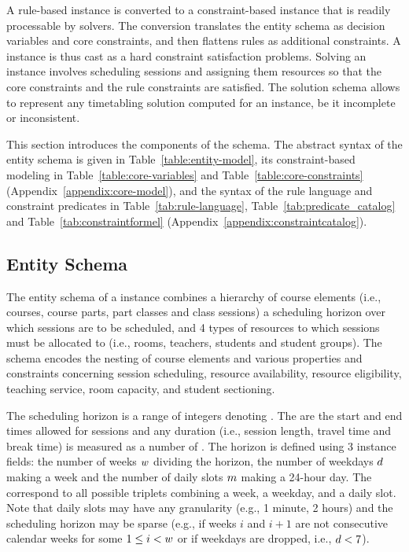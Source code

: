 \documentclass[runningheads]{llncs}
\begin{document}
A rule-based \UTP{} instance is 
converted
to a constraint-based instance
that is readily processable by solvers.
The conversion 
translates the entity schema as decision variables and core constraints, and then flattens rules as additional constraints.
A \UTP{} instance is thus cast as a hard constraint satisfaction problems.
Solving an instance involves scheduling sessions
and assigning them resources 
so that the core constraints and the rule constraints are satisfied.
The solution schema allows to represent
any timetabling solution computed for an instance,
be it incomplete or inconsistent.

This section introduces
the components of the schema.
The abstract syntax of the entity schema
is given in Table~\ref{table:entity-model},
its constraint-based modeling in
Table~\ref{table:core-variables} and
Table~\ref{table:core-constraints}
(Appendix~\ref{appendix:core-model}),
and the syntax of the rule language
and constraint predicates in
Table~\ref{tab:rule-language},
Table~\ref{tab:predicate_catalog} and
Table~\ref{tab:constraintformel}
(Appendix~\ref{appendix:constraintcatalog}).


\subsection{Entity Schema}
\label{sec:entity-schema}



The entity schema 
of a \UTP{} instance
combines
a hierarchy of course elements (i.e., courses, course parts, part classes and class sessions)
a scheduling horizon over which sessions are to be scheduled,
and 4 types of resources to which sessions must be allocated to
(i.e., rooms, teachers, students and student groups).
The schema encodes the nesting of course elements
and various properties and constraints 
concerning 
session scheduling,
resource availability, 
resource eligibility,
teaching service,
room capacity,
and student sectioning. 

The scheduling horizon is a range
of integers denoting \timepoints{}.
The \timepoints{} are the start and end times allowed for sessions
and any duration (i.e., session length, travel time and break time)
is measured as a number of \timepoints{}. 
The horizon is
defined using 3 instance fields: 
the number of weeks $w$ dividing the horizon, 
the number of weekdays $d$ making a week 
and the number of daily slots $m$ making a 24-hour day.
The \timepoints{} correspond to all possible triplets combining a week, a weekday, and a daily slot. 
Note that daily slots may have any granularity (e.g., 1 minute, 2 hours)
and
the scheduling horizon may be sparse
(e.g., if weeks $i$ and $i+1$ are not consecutive calendar weeks for some $1\leq i<w$ 
or if weekdays are dropped, i.e., $d<7$).
\end{document}
